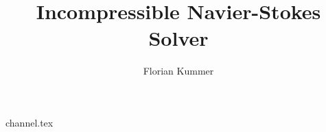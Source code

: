 \documentclass[10pt,a4paper]{article}
\title{Incompressible Navier-Stokes Solver}
\author{Florian Kummer}
\begin{document}
\maketitle

{channel.tex}
\end{document}
